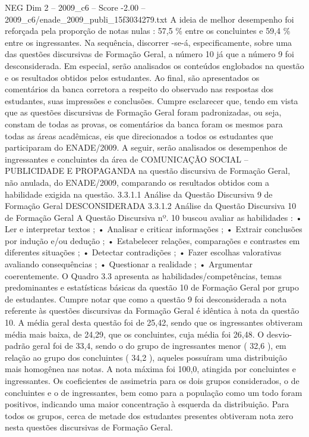 \begin{textsample}{NEG Dim 2 – 2009\_c6 – Score -2.00 – 2009\_c6/enade\_2009\_publi\_15f3034279.txt}
A ideia de melhor desempenho foi reforçada pela proporção de notas nulas : 57,5 \% entre os concluintes e 59,4 \% entre os ingressantes.
Na sequência, discorrer -se-á, especificamente, sobre uma das questões discursivas de Formação Geral, a número 10 já que a número 9 foi desconsiderada.
Em especial, serão analisados os conteúdos englobados na questão e os resultados obtidos pelos estudantes.
Ao final, são apresentados os comentários da banca corretora a respeito do observado nas respostas dos estudantes, suas impressões e conclusões.
Cumpre esclarecer que, tendo em vista que as questões discursivas de Formação Geral foram padronizadas, ou seja, constam de todas as provas, os comentários da banca foram os mesmos para todas as áreas acadêmicas, eis que direcionados a todos os estudantes que participaram do ENADE/2009.
A seguir, serão analisados os desempenhos de ingressantes e concluintes da área de COMUNICAÇÃO SOCIAL – PUBLICIDADE E PROPAGANDA na questão discursiva de Formação Geral, não anulada, do ENADE/2009, comparando os resultados obtidos com a habilidade exigida na questão. 3.3.1.1 Análise da Questão Discursiva 9 de Formação Geral DESCONSIDERADA 3.3.1.2 Análise da Questão Discursiva 10 de Formação Geral A Questão Discursiva nº. 10 buscou avaliar as habilidades : • Ler e interpretar textos ; • Analisar e criticar informações ; • Extrair conclusões por indução e/ou dedução ; • Estabelecer relações, comparações e contrastes em diferentes situações ; • Detectar contradições ; • Fazer escolhas valorativas avaliando consequências ; • Questionar a realidade ; • Argumentar coerentemente.
O Quadro 3.3 apresenta as habilidades/competências, temas predominantes e estatísticas básicas da questão 10 de Formação Geral por grupo de estudantes.
Cumpre notar que como a questão 9 foi desconsiderada a nota referente às questões discursivas da Formação Geral é idêntica à nota da questão 10.
A média geral desta questão foi de 25,42, sendo que os ingressantes obtiveram média mais baixa, de 24,29, que os concluintes, cuja média foi 26,48.
O desvio-padrão geral foi de 33,4, sendo o do grupo de ingressantes menor ( 32,6 ), em relação ao grupo dos concluintes ( 34,2 ), aqueles possuíram uma distribuição mais homogênea nas notas.
A nota máxima foi 100,0, atingida por concluintes e ingressantes.
Os coeficientes de assimetria para os dois grupos considerados, o de concluintes e o de ingressantes, bem como para a população como um todo foram positivos, indicando uma maior concentração à esquerda da distribuição.
Para todos os grupos, cerca de metade dos estudantes presentes obtiveram nota zero nesta questões discursivas de Formação Geral.

\end{textsample}
